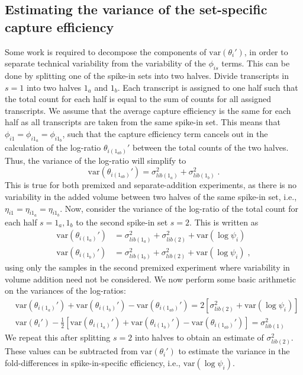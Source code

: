 \documentclass{article}
\begin{document}
\subsection{Estimating the variance of the set-specific capture efficiency}
Some work is required to decompose the components of $\mbox{var}(\theta_i')$, in order to separate technical variability from the variability of the $\phi_{is}$ terms.
This can be done by splitting one of the spike-in sets into two halves.
Divide transcripts in $s=1$ into two halves $1_a$ and $1_b$.
Each transcript is assigned to one half such that the total count for each half is equal to the sum of counts for all assigned transcripts.
We assume that the average capture efficiency is the same for each half as all transcripts are taken from the same spike-in set.
This means that $\phi_{i1} = \phi_{i1_a} = \phi_{i1_b}$, such that the capture efficiency term cancels out in the calculation of the log-ratio $\theta_{i(1_{ab})}'$ between the total counts of the two halves.
Thus, the variance of the log-ratio will simplify to 
\[
    \mbox{var}(\theta_{i(1_{ab})}') = \sigma^2_{lib(1_a)} + \sigma^2_{lib(1_b)} \;.
\]
This is true for both premixed and separate-addition experiments, as there is no variability in the added volume between two halves of the same spike-in set, i.e.,  $\eta_{i1} = \eta_{i1_a} = \eta_{i1_b}$.
Now, consider the variance of the log-ratio of the total count for each half $s=1_a, 1_b$ to the second spike-in set $s=2$.
This is written as
\begin{align*}
    \mbox{var}(\theta_{i(1_a)}') &= \sigma^2_{lib(1_a)} + \sigma^2_{lib(2)} + \mbox{var}(\log \psi_i) \\
    \mbox{var}(\theta_{i(1_b)}') &= \sigma^2_{lib(1_b)} + \sigma^2_{lib(2)} + \mbox{var}(\log \psi_i) \;,
\end{align*}
using only the samples in the second premixed experiment where variability in volume addition need not be considered.
We now perform some basic arithmetic on the variances of the log-ratios:
\begin{align*}
    &\mbox{var}(\theta_{i(1_a)}') +  \mbox{var}(\theta_{i(1_b)}') - \mbox{var}(\theta_{i(1_{ab})}') = 2 [\sigma^2_{lib(2)} + \mbox{var}(\log \psi_i)] \\
    &\mbox{var}(\theta_i') - \textstyle\frac{1}{2}[\mbox{var}(\theta_{i(1_a)}') + \mbox{var}(\theta_{i(1_b)}') - \mbox{var}(\theta_{i(1_{ab})}') ] = \sigma^2_{lib(1)}
\end{align*}
We repeat this after splitting $s=2$ into halves to obtain an estimate of $\sigma^2_{lib(2)}$.
These values can be subtracted from $\mbox{var}(\theta_i')$ to estimate the variance in the fold-differences in spike-in-specific efficiency, i.e., $\mbox{var}(\log \psi_i)$.
\end{document}
